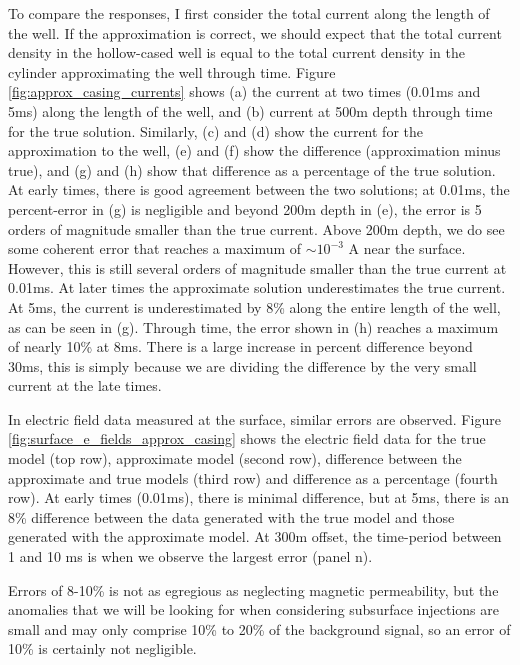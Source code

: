 To compare the responses, I first consider the total current along the length of the well. If the approximation is correct, we should expect that the total current density in the hollow-cased well is equal to the total current density in the cylinder approximating the well through time. Figure \ref{fig:approx_casing_currents} shows (a) the current at two times (0.01ms and 5ms) along the length of the well, and (b) current at 500m depth through time for the true solution. Similarly, (c) and (d) show the current for the approximation to the well, (e) and (f) show the difference (approximation minus true), and (g) and (h) show that difference as a percentage of the true solution. At early times, there is good agreement between the two solutions; at 0.01ms, the percent-error in (g) is negligible and beyond 200m depth in (e), the error is 5 orders of magnitude smaller than the true current. Above 200m depth, we do see some coherent error that reaches a maximum of $\sim10^{-3}$ A near the surface. However, this is still several orders of magnitude smaller than the true current at 0.01ms. At later times the approximate solution underestimates the true current. At 5ms, the current is underestimated by 8\% along the entire length of the well, as can be seen in (g). Through time, the error shown in (h) reaches a maximum of nearly 10\% at 8ms. There is a large increase in percent difference beyond 30ms, this is simply because we are dividing the difference by the very small current at the late times.



In electric field data measured at the surface, similar errors are observed. Figure \ref{fig:surface_e_fields_approx_casing} shows the electric field data for the true model (top row), approximate model (second row), difference between the approximate and true models (third row) and difference as a percentage (fourth row). At early times (0.01ms), there is minimal difference, but at 5ms, there is an 8\% difference between the data generated with the true model and those generated with the approximate model. At 300m offset, the time-period between 1 and 10 ms is when we observe the largest error (panel n).

Errors of 8-10\% is not as egregious as neglecting magnetic permeability, but the anomalies that we will be looking for when considering subsurface injections are small and may only comprise 10\% to 20\% of the background signal, so an error of 10\% is certainly not negligible.

